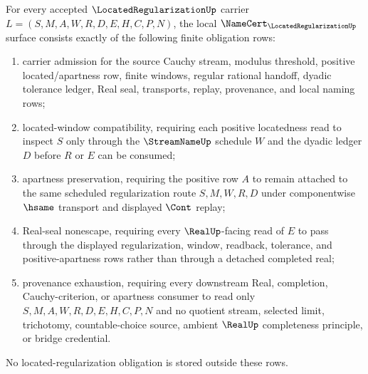 \begin{theorem}
\label{thm:located-regularization-namecert-obligations}
For every accepted $\LocatedRegularizationUp$ carrier $L=(S,M,A,W,R,D,E,H,C,P,N)$, the local $\NameCert_{\LocatedRegularizationUp}$ surface consists exactly of the following finite obligation rows:
\begin{enumerate}
\item carrier admission for the source Cauchy stream, modulus threshold, positive located/apartness row, finite windows, regular rational handoff, dyadic tolerance ledger, Real seal, transports, replay, provenance, and local naming rows;
\item located-window compatibility, requiring each positive locatedness read to inspect $S$ only through the $\StreamNameUp$ schedule $W$ and the dyadic ledger $D$ before $R$ or $E$ can be consumed;
\item apartness preservation, requiring the positive row $A$ to remain attached to the same scheduled regularization route $S,M,W,R,D$ under componentwise $\hsame$ transport and displayed $\Cont$ replay;
\item Real-seal nonescape, requiring every $\RealUp$-facing read of $E$ to pass through the displayed regularization, window, readback, tolerance, and positive-apartness rows rather than through a detached completed real;
\item provenance exhaustion, requiring every downstream Real, completion, Cauchy-criterion, or apartness consumer to read only $S,M,A,W,R,D,E,H,C,P,N$ and no quotient stream, selected limit, trichotomy, countable-choice source, ambient $\RealUp$ completeness principle, or bridge credential.
\end{enumerate}
No located-regularization obligation is stored outside these rows.
\end{theorem}
